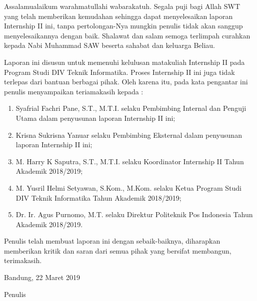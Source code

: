 \begin{acknowledgements}
Assalamualaikum warahmatullahi wabarakatuh. Segala puji bagi Allah SWT yang telah memberikan kemudahan sehingga dapat menyelesaikan laporan Internship II ini, tanpa pertolongan-Nya mungkin penulis tidak akan sanggup menyelesaikannya dengan baik. Shalawat dan salam semoga terlimpah curahkan kepada Nabi Muhammad SAW beserta sahabat dan keluarga Beliau.

Laporan ini disusun untuk memenuhi kelulusan matakuliah Internship II pada Program Studi DIV Teknik Informatika. Proses Internship II ini juga tidak terlepas dari bantuan berbagai pihak. Oleh karena itu, pada kata pengantar ini penulis menyampaikan teriamakasih kepada :
\begin{enumerate}

\item Syafrial Fachri Pane, S.T., M.T.I. selaku Pembimbing Internal dan Penguji Utama dalam penyusunan laporan Internship II ini;
\item Krisna Sukrisna Yanuar selaku Pembimbing Eksternal dalam penyusunan laporan Internship II ini;
\item	M. Harry K Saputra, S.T., M.T.I. selaku Koordinator Internship II Tahun Akademik 2018/2019;
\item	M. Yusril Helmi Setyawan, S.Kom., M.Kom. selaku Ketua Program Studi DIV Teknik Informatika Tahun Akademik 2018/2019;
\item	Dr. Ir. Agus Purnomo, M.T. selaku Direktur Politeknik Pos Indonesia Tahun Akademik 2018/2019.

\end{enumerate}

Penulis telah membuat laporan ini dengan sebaik-baiknya, diharapkan memberikan kritik dan saran dari semua pihak yang bersifat membangun, terimakasih.

\begin{raggedleft}

Bandung, 22 Maret 2019

Penulis

\end{raggedleft}

\end{acknowledgements}
